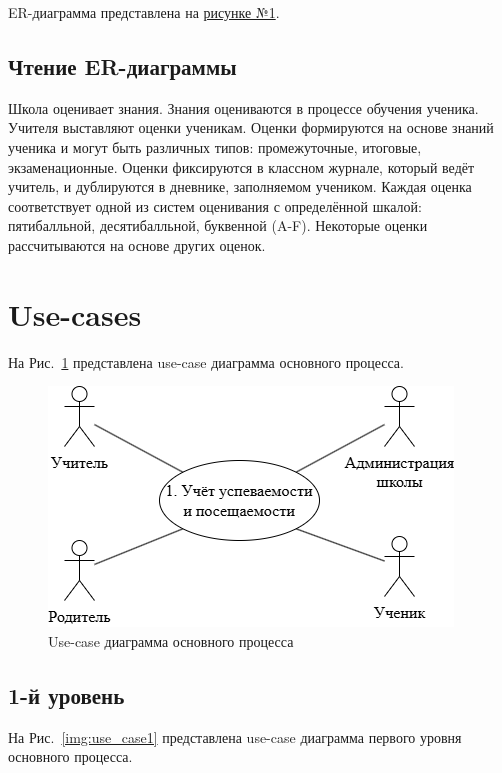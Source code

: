 \documentclass[a4paper, final]{article}
\begin{document}
ER-диаграмма представлена на \hyperlink{diag:er}{рисунке №1}.

\newpage
\hypertarget{diag:er}{}

\addtocounter{figure}{1}
\newpage

\subsection{Чтение ER-диаграммы}
Школа оценивает знания. Знания оцениваются в процессе обучения ученика. Учителя выставляют оценки ученикам. Оценки формируются на основе знаний ученика и могут быть различных типов: промежуточные, итоговые, экзаменационные. Оценки фиксируются в классном журнале, который ведёт учитель, и дублируются в дневнике, заполняемом учеником. Каждая оценка соответствует одной из систем оценивания с определённой шкалой: пятибалльной, десятибалльной, буквенной (A-F). Некоторые оценки рассчитываются на основе других оценок.

\newpage
\section{Use-cases}
На Рис.~\ref{img:use_case0} представлена use-case диаграмма основного процесса.
\begin{figure}[H]
  \centering
  \includegraphics[width=0.9\linewidth]{use_case0.png}
  \caption{Use-case диаграмма основного процесса}
  \label{img:use_case0}
\end{figure}

\subsection{1-й уровень}
На Рис.~\ref{img:use_case1} представлена use-case диаграмма первого уровня основного процесса.
\end{document}
